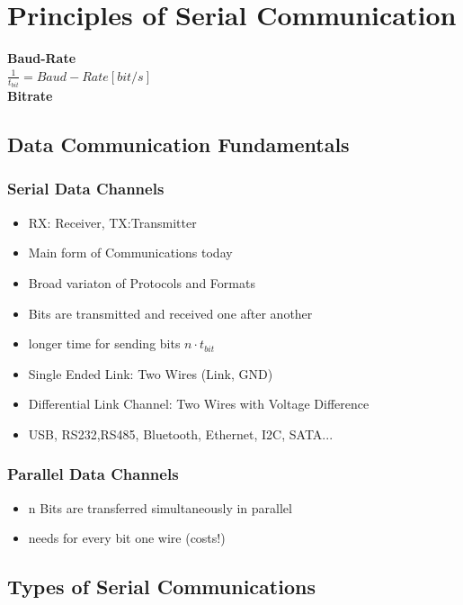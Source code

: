 \section{Principles of Serial Communication}
\begin{multicols}{2}
	\textbf{Baud-Rate}\\
	$\frac{1}{t_{bit}}=Baud-Rate [bit/s]$\\
	\textbf{Bitrate}\\
\end{multicols}
\subsection{Data Communication Fundamentals}
	\subsubsection{Serial Data Channels}
	\begin{itemize}
		\item RX: Receiver, TX:Transmitter
		\item Main form of Communications today
		\item Broad variaton of Protocols and Formats
		\item Bits are transmitted and received one after another
		\item longer time for sending bits $n\cdot t_{bit}$
		\item Single Ended Link: Two Wires (Link, GND)
		\item Differential Link Channel: Two Wires with Voltage Difference
		\item USB, RS232,RS485, Bluetooth, Ethernet, I2C, SATA...
	\end{itemize}
\subsubsection{Parallel Data Channels}
	\begin{itemize}
		\item n Bits are transferred simultaneously in parallel
		\item needs for every bit one wire (costs!)
	\end{itemize}
	
\subsection{Types of Serial Communications}
